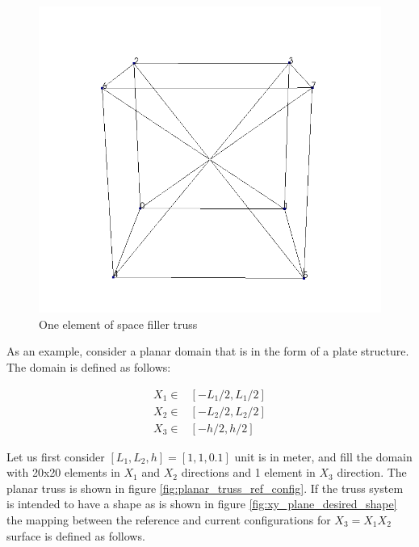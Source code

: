 \begin{figure} 
\centering
\includegraphics[width=5.0in]{./chap_5_active_trusses/images_space_filler/cube.png}
\caption{One element of space filler truss}
\label{fig:cuber_space_filler_truss}
\end{figure}

As an example, consider a planar domain that is in the form of a plate structure.
The domain is defined as follows:

\begin{equation} 
\begin{aligned}
X_1 \in & [-L_1/2,L_1/2] \\
X_2 \in & [-L_2/2,L_2/2] \\
X_3 \in & [-h/2,h/2]
\end{aligned}
\label{planar_truss_domain:eqn}
\end{equation}
 
Let us first consider $[L_1,L_2,h]=[1,1,0.1]$ unit is in meter, and fill the domain with 20x20 elements in $X_1$ and $X_2$ directions and 1 element in $X_3$ direction. 
The planar truss is shown in figure \ref{fig:planar_truss_ref_config}.  
If the truss system is intended to have a shape as is shown in figure \ref{fig:xy_plane_desired_shape} the mapping between the reference and current configurations for $X_3=X_1 X_2$ surface is defined as follows.



